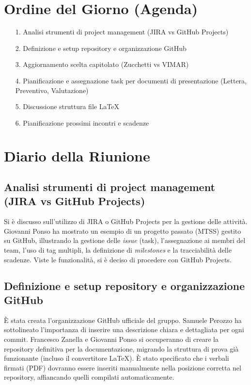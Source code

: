 \documentclass[a4paper, 11pt, oneside]{scrartcl} %
\begin{document}
\newpage
\section{Ordine del Giorno (Agenda)}
\begin{itemize}
    \item[1.] Analisi strumenti di project management (JIRA vs GitHub Projects)
    \item[2.] Definizione e setup repository e organizzazione GitHub
    \item[3.] Aggiornamento scelta capitolato (Zucchetti vs VIMAR)
    \item[4.] Pianificazione e assegnazione task per documenti di presentazione (Lettera, Preventivo, Valutazione)
    \item[5.] Discussione struttura file LaTeX
    \item[6.] Pianificazione prossimi incontri e scadenze
\end{itemize}

\newpage
\section{Diario della Riunione}

\subsection{Analisi strumenti di project management (JIRA vs GitHub Projects)}
Si è discusso sull'utilizzo di JIRA o GitHub Projects per la gestione delle attività. 
Giovanni Ponso ha mostrato un esempio di un progetto passato (MTSS) gestito su GitHub, illustrando la gestione delle \textit{issue} (task), l'assegnazione ai membri del team, l'uso di tag multipli, la definizione di \textit{milestones} e la tracciabilità delle scadenze.
Viste le funzionalità, si è deciso di procedere con GitHub Projects.

\subsection{Definizione e setup repository e organizzazione GitHub}
È stata creata l'organizzazione GitHub ufficiale del gruppo. 
Samuele Perozzo ha sottolineato l'importanza di inserire una descrizione chiara e dettagliata per ogni commit.
Francesco Zanella e Giovanni Ponso si occuperanno di creare la repository definitiva per la documentazione, migrando la struttura di prova già funzionante (incluso il convertitore LaTeX). 
È stato specificato che i verbali firmati (PDF) dovranno essere inseriti manualmente nella posizione corretta nel repository, affiancando quelli compilati automaticamente.
\end{document}
